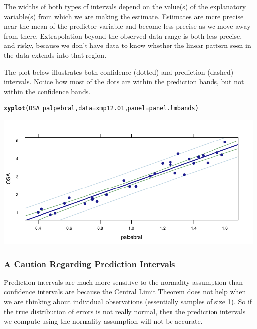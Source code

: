 \documentclass[twoside]{book}\usepackage[]{graphicx}\usepackage[]{xcolor}
\makeatletter
\newcommand{\hlopt}[1]{\textcolor[rgb]{0,0,0}{#1}}%
\newcommand{\hlstd}[1]{\textcolor[rgb]{0.345,0.345,0.345}{#1}}%
\newcommand{\hlkwc}[1]{\textcolor[rgb]{0.333,0.667,0.333}{#1}}%
\newcommand{\hlkwd}[1]{\textcolor[rgb]{0.737,0.353,0.396}{\textbf{#1}}}%
\newenvironment{kframe}{%
 \def\at@end@of@kframe{}%
 \ifinner\ifhmode%
  \def\at@end@of@kframe{\end{minipage}}%
  \begin{minipage}{\columnwidth}%
 \fi\fi%
 \def\FrameCommand##1{\hskip\@totalleftmargin \hskip-\fboxsep
 \colorbox{shadecolor}{##1}\hskip-\fboxsep
     \hskip-\linewidth \hskip-\@totalleftmargin \hskip\columnwidth}%
 \MakeFramed {\advance\hsize-\width
   \@totalleftmargin\z@ \linewidth\hsize
   \@setminipage}}%
 {\par\unskip\endMakeFramed%
 \at@end@of@kframe}
\newenvironment{knitrout}{}{} %
\makeatother
\begin{document}
The widths of both types of intervals depend on the value(s) of the explanatory
variable(s) from which we are making the estimate.  Estimates are more
precise near the mean of the predictor variable and become less precise as we move
away from there.  Extrapolation beyond the observed data range is both less precise, and risky,
because we don't have data to know whether the linear pattern seen in the data
extends into that region.

The plot below illustrates both confidence (dotted) and prediction (dashed) 
intervals.
Notice how most of the dots are within the prediction bands, but not within the 
confidence bands.
\begin{knitrout}
\color{fgcolor}\begin{kframe}
\begin{alltt}
\hlkwd{xyplot}\hlstd{(OSA} \hlopt{~} \hlstd{palpebral,} \hlkwc{data} \hlstd{= xmp12.01,} \hlkwc{panel} \hlstd{= panel.lmbands)}
\end{alltt}
\end{kframe}

{\centering \includegraphics[width=.9\textwidth]{figures/fig-unnamed-chunk-180-1} 

}



\end{knitrout}

\subsubsection{A Caution Regarding Prediction Intervals}
Prediction intervals are much more sensitive to the normality assumption
than confidence intervals are because the Central Limit Theorem does not 
help when we are thinking about individual observations (essentially samples of 
size 1).  So if the true distribution of errors is not really normal, then the prediction intervals we compute using the normality assumption will not be accurate.
\end{document}
